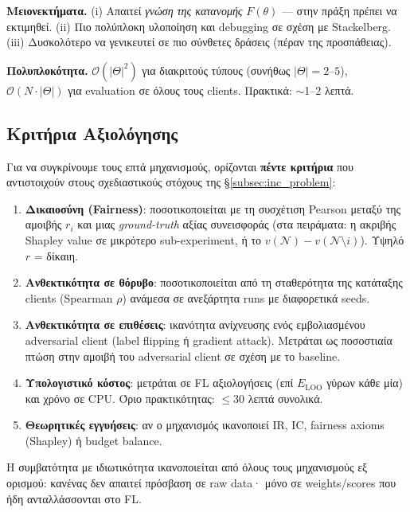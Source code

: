 \textbf{Μειονεκτήματα.} (i) Απαιτεί \emph{γνώση της κατανομής} $F(\theta)$ — στην πράξη πρέπει να
εκτιμηθεί. (ii) Πιο πολύπλοκη υλοποίηση και debugging σε σχέση με Stackelberg. (iii) Δυσκολότερο να
γενικευτεί σε πιο σύνθετες δράσεις (πέραν της προσπάθειας).

\textbf{Πολυπλοκότητα.} $\mathcal{O}(|\Theta|^2)$ για διακριτούς τύπους (συνήθως $|\Theta| = 2$--$5$),
$\mathcal{O}(N \cdot |\Theta|)$ για evaluation σε όλους τους clients. Πρακτικά: $\sim$1--2 λεπτά.

\subsection{Κριτήρια Αξιολόγησης}
\label{subsec:inc_criteria}

Για να συγκρίνουμε τους επτά μηχανισμούς, ορίζονται \textbf{πέντε κριτήρια} που αντιστοιχούν στους
σχεδιαστικούς στόχους της §\ref{subsec:inc_problem}:

\begin{enumerate}[label=\textbf{C\arabic*.}, leftmargin=2.5em]
    \item \textbf{Δικαιοσύνη (Fairness)}: ποσοτικοποιείται με τη συσχέτιση Pearson μεταξύ της αμοιβής
    $r_i$ και μιας \emph{ground-truth} αξίας συνεισφοράς (στα πειράματα: η ακριβής Shapley value σε
    μικρότερο sub-experiment, ή το $v(\mathcal N) - v(\mathcal N \setminus i)$). Υψηλό $r$ = δίκαιη.
    \item \textbf{Ανθεκτικότητα σε θόρυβο}: ποσοτικοποιείται από τη σταθερότητα της κατάταξης clients
    (Spearman $\rho$) ανάμεσα σε ανεξάρτητα runs με διαφορετικά seeds.
    \item \textbf{Ανθεκτικότητα σε επιθέσεις}: ικανότητα ανίχνευσης ενός εμβολιασμένου adversarial
    client (label flipping ή gradient attack). Μετράται ως ποσοστιαία πτώση στην αμοιβή του
    adversarial client σε σχέση με το baseline.
    \item \textbf{Υπολογιστικό κόστος}: μετράται σε FL αξιολογήσεις (επί $E_{\text{LOO}}$ γύρων κάθε
    μία) και χρόνο σε CPU. Όριο πρακτικότητας: $\leq 30$ λεπτά συνολικά.
    \item \textbf{Θεωρητικές εγγυήσεις}: αν ο μηχανισμός ικανοποιεί IR, IC, fairness axioms (Shapley)
    ή budget balance.
\end{enumerate}

Η συμβατότητα με ιδιωτικότητα ικανοποιείται από όλους τους μηχανισμούς εξ ορισμού: κανένας δεν απαιτεί
πρόσβαση σε raw data· μόνο σε weights/scores που ήδη ανταλλάσσονται στο FL.

